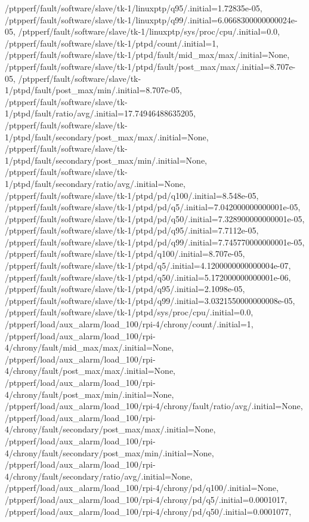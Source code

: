 {    /ptpperf/fault/software/slave/tk-1/linuxptp/q95/.initial=1.72835e-05,
    /ptpperf/fault/software/slave/tk-1/linuxptp/q99/.initial=6.0668300000000024e-05,
    /ptpperf/fault/software/slave/tk-1/linuxptp/sys/proc/cpu/.initial=0.0,
    /ptpperf/fault/software/slave/tk-1/ptpd/count/.initial=1,
    /ptpperf/fault/software/slave/tk-1/ptpd/fault/mid_max/max/.initial=None,
    /ptpperf/fault/software/slave/tk-1/ptpd/fault/post_max/max/.initial=8.707e-05,
    /ptpperf/fault/software/slave/tk-1/ptpd/fault/post_max/min/.initial=8.707e-05,
    /ptpperf/fault/software/slave/tk-1/ptpd/fault/ratio/avg/.initial=17.74946488635205,
    /ptpperf/fault/software/slave/tk-1/ptpd/fault/secondary/post_max/max/.initial=None,
    /ptpperf/fault/software/slave/tk-1/ptpd/fault/secondary/post_max/min/.initial=None,
    /ptpperf/fault/software/slave/tk-1/ptpd/fault/secondary/ratio/avg/.initial=None,
    /ptpperf/fault/software/slave/tk-1/ptpd/pd/q100/.initial=8.548e-05,
    /ptpperf/fault/software/slave/tk-1/ptpd/pd/q5/.initial=7.042000000000001e-05,
    /ptpperf/fault/software/slave/tk-1/ptpd/pd/q50/.initial=7.328900000000001e-05,
    /ptpperf/fault/software/slave/tk-1/ptpd/pd/q95/.initial=7.7112e-05,
    /ptpperf/fault/software/slave/tk-1/ptpd/pd/q99/.initial=7.745770000000001e-05,
    /ptpperf/fault/software/slave/tk-1/ptpd/q100/.initial=8.707e-05,
    /ptpperf/fault/software/slave/tk-1/ptpd/q5/.initial=4.1200000000000004e-07,
    /ptpperf/fault/software/slave/tk-1/ptpd/q50/.initial=5.172000000000001e-06,
    /ptpperf/fault/software/slave/tk-1/ptpd/q95/.initial=2.1098e-05,
    /ptpperf/fault/software/slave/tk-1/ptpd/q99/.initial=3.0321550000000008e-05,
    /ptpperf/fault/software/slave/tk-1/ptpd/sys/proc/cpu/.initial=0.0,
    /ptpperf/load/aux_alarm/load_100/rpi-4/chrony/count/.initial=1,
    /ptpperf/load/aux_alarm/load_100/rpi-4/chrony/fault/mid_max/max/.initial=None,
    /ptpperf/load/aux_alarm/load_100/rpi-4/chrony/fault/post_max/max/.initial=None,
    /ptpperf/load/aux_alarm/load_100/rpi-4/chrony/fault/post_max/min/.initial=None,
    /ptpperf/load/aux_alarm/load_100/rpi-4/chrony/fault/ratio/avg/.initial=None,
    /ptpperf/load/aux_alarm/load_100/rpi-4/chrony/fault/secondary/post_max/max/.initial=None,
    /ptpperf/load/aux_alarm/load_100/rpi-4/chrony/fault/secondary/post_max/min/.initial=None,
    /ptpperf/load/aux_alarm/load_100/rpi-4/chrony/fault/secondary/ratio/avg/.initial=None,
    /ptpperf/load/aux_alarm/load_100/rpi-4/chrony/pd/q100/.initial=None,
    /ptpperf/load/aux_alarm/load_100/rpi-4/chrony/pd/q5/.initial=0.0001017,
    /ptpperf/load/aux_alarm/load_100/rpi-4/chrony/pd/q50/.initial=0.0001077,
}
